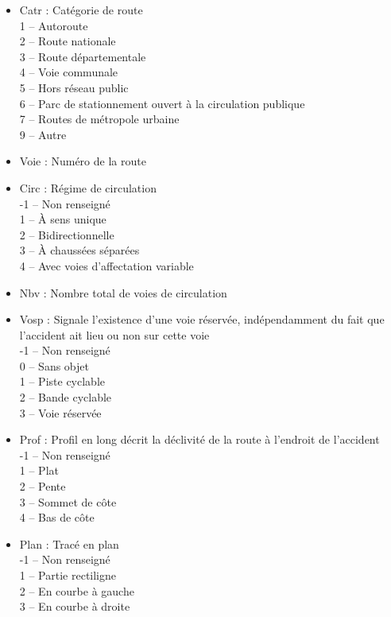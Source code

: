 \documentclass[french,]{tp}
\begin{document}
\begin{itemize}
  \begin{itemize}
  \item
    Catr : Catégorie de route\\
    1 -- Autoroute\\
    2 -- Route nationale\\
    3 -- Route départementale\\
    4 -- Voie communale\\
    5 -- Hors réseau public\\
    6 -- Parc de stationnement ouvert à la circulation publique\\
    7 -- Routes de métropole urbaine\\
    9 -- Autre
  \item
    Voie : Numéro de la route
  \item
    Circ : Régime de circulation\\
    -1 -- Non renseigné\\
    1 -- À sens unique\\
    2 -- Bidirectionnelle\\
    3 -- À chaussées séparées\\
    4 -- Avec voies d'affectation variable
  \item
    Nbv : Nombre total de voies de circulation
  \item
    Vosp : Signale l'existence d'une voie réservée, indépendamment du fait que l'accident ait lieu ou non sur cette voie\\
    -1 -- Non renseigné\\
    0 -- Sans objet\\
    1 -- Piste cyclable\\
    2 -- Bande cyclable\\
    3 -- Voie réservée
  \item
    Prof : Profil en long décrit la déclivité de la route à l'endroit de l'accident\\
    -1 -- Non renseigné\\
    1 -- Plat\\
    2 -- Pente\\
    3 -- Sommet de côte\\
    4 -- Bas de côte
  \item
    Plan : Tracé en plan\\
    -1 -- Non renseigné\\
    1 -- Partie rectiligne\\
    2 -- En courbe à gauche\\
    3 -- En courbe à droite\\

\end{itemize}
\end{itemize}
\end{document}
